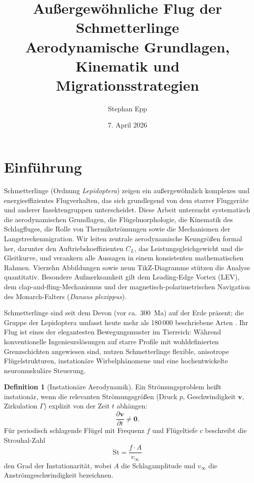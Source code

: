 ﻿\documentclass[a4paper,12pt]{article}
\title{\textbf{Außergewöhnliche Flug der Schmetterlinge}\\[-0.4em]
	{\large Aerodynamische Grundlagen, Kinematik und Migrationsstrategien}}
\author{Stephan Epp}
\date{7. April 2026}
\theoremstyle{definition}
\newtheorem{definition}{Definition}
\begin{document}
	
	\maketitle
	
	\tableofcontents
	\newpage
	
	\section{Einführung}
	Schmetterlinge (Ordnung \textit{Lepidoptera}) zeigen ein außergewöhnlich komplexes und
	energieeffizientes Flugverhalten, das sich grundlegend von dem starrer Fluggeräte und
	anderer Insektengruppen unterscheidet. Diese Arbeit untersucht systematisch die
	aerodynamischen Grundlagen, die Flügelmorphologie, die Kinematik des Schlagfluges, die
	Rolle von Thermikströmungen sowie die Mechanismen der Langstreckenmigration.
	Wir leiten zentrale aerodynamische Kenngrößen formal her, darunter den
	Auftriebskoeffizienten $C_L$, das Leistungsgleichgewicht und die Gleitkurve,
	und verankern alle Aussagen in einem konsistenten mathematischen Rahmen.
	Vierzehn Abbildungen sowie neun TikZ-Diagramme stützen die Analyse quantitativ.
	Besondere Aufmerksamkeit gilt dem Leading-Edge Vortex (LEV), dem clap-and-fling-Mechanismus
	und der magnetisch-polarimetrischen Navigation des Monarch-Falters (\textit{Danaus plexippus}).
	
	Schmetterlinge sind seit dem Devon (vor ca.\ \SI{300}{Ma}) auf der Erde präsent;
	die Gruppe der Lepidoptera umfasst heute mehr als 180\,000 beschriebene Arten
	\cite{grimaldi2005evolution}.
	Ihr Flug ist eines der elegantesten Bewegungsmuster im Tierreich:
	Während konventionelle Ingenieurslösungen auf starre Profile mit wohldefinierten
	Grenzschichten angewiesen sind, nutzen Schmetterlinge flexible, anisotrope Flügelstrukturen,
	instationäre Wirbelphänomene und eine hochentwickelte neuromuskuläre Steuerung.
	
	\begin{definition}[Instationäre Aerodynamik]
		Ein Strömungsproblem heißt instationär, wenn die relevanten Strömungsgrößen
		(Druck $p$, Geschwindigkeit $\boldsymbol{v}$, Zirkulation $\Gamma$) explizit von
		der Zeit $t$ abhängen:
		\[
		\frac{\partial \boldsymbol{v}}{\partial t} \neq \boldsymbol{0}.
		\]
		Für periodisch schlagende Flügel mit Frequenz $f$ und Flügeltiefe $c$ beschreibt
		die Strouhal-Zahl
		\[
		\mathrm{St} = \frac{f \cdot A}{v_\infty}
		\]
		den Grad der Instationarität, wobei $A$ die Schlagamplitude und $v_\infty$ die
		Anströmgeschwin\-digkeit bezeichnen.
	\end{definition}
	
\end{document}
